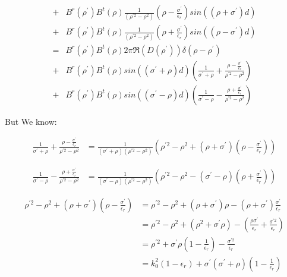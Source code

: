 \documentclass[11pt, oneside]{article}   	%
\begin{document}
\begin{align*}
+ & B^{r}\left(\rho^{\prime}\right)B^{t}\left(\rho\right)\frac{1}{\left(\rho^{\prime2}-\rho^{2}\right)}\left(\rho-\frac{\sigma^{\prime}}{\epsilon_{r}}\right)sin\left(\left(\rho+\sigma^{\prime}\right)d\right)\\
+ & B^{r}\left(\rho^{\prime}\right)B^{t}\left(\rho\right)\frac{1}{\left(\rho^{\prime2}-\rho^{2}\right)}\left(\rho+\frac{\sigma^{\prime}}{\epsilon_{r}}\right)sin\left(\left(\rho-\sigma^{\prime}\right)d\right)\\
= & B^{r}\left(\rho^{\prime}\right)B^{t}\left(\rho\right)2\pi\Re\left(D\left(\rho^{\prime}\right)\right)\delta\left(\rho-\rho^{\prime}\right)\\
+ & B^{r}\left(\rho^{\prime}\right)B^{t}\left(\rho\right)sin\left(\left(\sigma^{\prime}+\rho\right)d\right)\left(\frac{1}{\sigma^{\prime}+\rho}+\frac{\rho-\frac{\sigma^{\prime}}{\epsilon_{r}}}{\rho^{\prime2}-\rho^{2}}\right)\\
+ & B^{r}\left(\rho^{\prime}\right)B^{t}\left(\rho\right)sin\left(\left(\sigma^{\prime}-\rho\right)d\right)\left(\frac{1}{\sigma^{\prime}-\rho}-\frac{\rho+\frac{\sigma^{\prime}}{\epsilon_{r}}}{\rho^{\prime2}-\rho^{2}}\right)
\end{align*}


But We know:

\begin{align*}
\frac{1}{\sigma^{\prime}+\rho}+\frac{\rho-\frac{\sigma^{\prime}}{\epsilon_{r}}}{\rho^{\prime2}-\rho^{2}} & =\frac{1}{\left(\sigma^{\prime}+\rho\right)\left(\rho^{\prime2}-\rho^{2}\right)}\left(\rho^{\prime2}-\rho^{2}+\left(\rho+\sigma^{\prime}\right)\left(\rho-\frac{\sigma^{\prime}}{\epsilon_{r}}\right)\right)
\end{align*}


\begin{align*}
\frac{1}{\sigma^{\prime}-\rho}-\frac{\rho+\frac{\sigma^{\prime}}{\epsilon_{r}}}{\rho^{\prime2}-\rho^{2}} & =\frac{1}{\left(\sigma^{\prime}-\rho\right)\left(\rho^{\prime2}-\rho^{2}\right)}\left(\rho^{\prime2}-\rho^{2}-\left(\sigma^{\prime}-\rho\right)\left(\rho+\frac{\sigma^{\prime}}{\epsilon_{r}}\right)\right)
\end{align*}


\begin{align*}
\rho^{\prime2}-\rho^{2}+\left(\rho+\sigma^{\prime}\right)\left(\rho-\frac{\sigma^{\prime}}{\epsilon_{r}}\right) & =\rho^{\prime2}-\rho^{2}+\left(\rho+\sigma^{\prime}\right)\rho-\left(\rho+\sigma^{\prime}\right)\frac{\sigma^{\prime}}{\epsilon_{r}}\\
 & =\rho^{\prime2}-\rho^{2}+\left(\rho^{2}+\sigma^{\prime}\rho\right)-\left(\frac{\rho\sigma^{\prime}}{\epsilon_{r}}+\frac{\sigma^{\prime2}}{\epsilon_{r}}\right)\\
 & =\rho^{\prime2}+\sigma^{\prime}\rho\left(1-\frac{1}{\epsilon_{r}}\right)-\frac{\sigma^{\prime2}}{\epsilon_{r}}\\
 & =k_{0}^{2}\left(1-\epsilon_{r}\right)+\sigma^{\prime}\left(\sigma^{\prime}+\rho\right)\left(1-\frac{1}{\epsilon_{r}}\right)
\end{align*}
\end{document}
